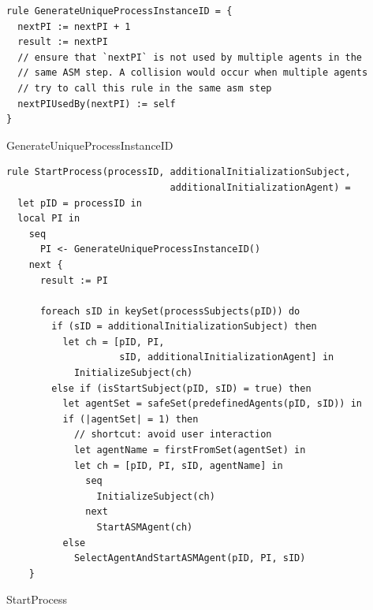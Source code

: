 \begin{listing}[H]
\begin{verbatim}
rule GenerateUniqueProcessInstanceID = {
  nextPI := nextPI + 1
  result := nextPI
  // ensure that `nextPI` is not used by multiple agents in the
  // same ASM step. A collision would occur when multiple agents
  // try to call this rule in the same asm step
  nextPIUsedBy(nextPI) := self
}
\end{verbatim}
\caption{GenerateUniqueProcessInstanceID}
\label{lst:asm:GenerateUniqueProcessInstanceID}
\end{listing}



\begin{listing}[H]
\begin{verbatim}
rule StartProcess(processID, additionalInitializationSubject,
                             additionalInitializationAgent) =
  let pID = processID in
  local PI in
    seq
      PI <- GenerateUniqueProcessInstanceID()
    next {
      result := PI

      foreach sID in keySet(processSubjects(pID)) do
        if (sID = additionalInitializationSubject) then
          let ch = [pID, PI,
                    sID, additionalInitializationAgent] in
            InitializeSubject(ch)
        else if (isStartSubject(pID, sID) = true) then
          let agentSet = safeSet(predefinedAgents(pID, sID)) in
          if (|agentSet| = 1) then
            // shortcut: avoid user interaction
            let agentName = firstFromSet(agentSet) in
            let ch = [pID, PI, sID, agentName] in
              seq
                InitializeSubject(ch)
              next
                StartASMAgent(ch)
          else
            SelectAgentAndStartASMAgent(pID, PI, sID)
    }
\end{verbatim}
\caption{StartProcess}
\label{lst:asm:StartProcess}
\end{listing}


